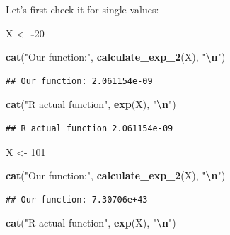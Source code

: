 \documentclass[
]{article}
\newenvironment{Shaded}{\begin{snugshade}}{\end{snugshade}}
\newcommand{\DecValTok}[1]{\textcolor[rgb]{0.00,0.00,0.81}{#1}}
\newcommand{\FunctionTok}[1]{\textcolor[rgb]{0.13,0.29,0.53}{\textbf{#1}}}
\newcommand{\NormalTok}[1]{#1}
\newcommand{\OtherTok}[1]{\textcolor[rgb]{0.56,0.35,0.01}{#1}}
\newcommand{\SpecialCharTok}[1]{\textcolor[rgb]{0.81,0.36,0.00}{\textbf{#1}}}
\newcommand{\StringTok}[1]{\textcolor[rgb]{0.31,0.60,0.02}{#1}}
\begin{document}
Let's first check it for single values:

\begin{Shaded}
\begin{Highlighting}[]
\NormalTok{X }\OtherTok{\textless{}{-}} \SpecialCharTok{{-}}\DecValTok{20}

\FunctionTok{cat}\NormalTok{(}\StringTok{"Our function:"}\NormalTok{, }\FunctionTok{calculate\_exp\_2}\NormalTok{(X), }\StringTok{"}\SpecialCharTok{\textbackslash{}n}\StringTok{"}\NormalTok{)}
\end{Highlighting}
\end{Shaded}

\begin{verbatim}
## Our function: 2.061154e-09
\end{verbatim}

\begin{Shaded}
\begin{Highlighting}[]
\FunctionTok{cat}\NormalTok{(}\StringTok{"R actual function"}\NormalTok{, }\FunctionTok{exp}\NormalTok{(X), }\StringTok{"}\SpecialCharTok{\textbackslash{}n}\StringTok{"}\NormalTok{)}
\end{Highlighting}
\end{Shaded}

\begin{verbatim}
## R actual function 2.061154e-09
\end{verbatim}

\begin{Shaded}
\begin{Highlighting}[]
\NormalTok{X }\OtherTok{\textless{}{-}} \DecValTok{101}

\FunctionTok{cat}\NormalTok{(}\StringTok{"Our function:"}\NormalTok{, }\FunctionTok{calculate\_exp\_2}\NormalTok{(X), }\StringTok{"}\SpecialCharTok{\textbackslash{}n}\StringTok{"}\NormalTok{)}
\end{Highlighting}
\end{Shaded}

\begin{verbatim}
## Our function: 7.30706e+43
\end{verbatim}

\begin{Shaded}
\begin{Highlighting}[]
\FunctionTok{cat}\NormalTok{(}\StringTok{"R actual function"}\NormalTok{, }\FunctionTok{exp}\NormalTok{(X), }\StringTok{"}\SpecialCharTok{\textbackslash{}n}\StringTok{"}\NormalTok{)}
\end{Highlighting}
\end{Shaded}
\end{document}
